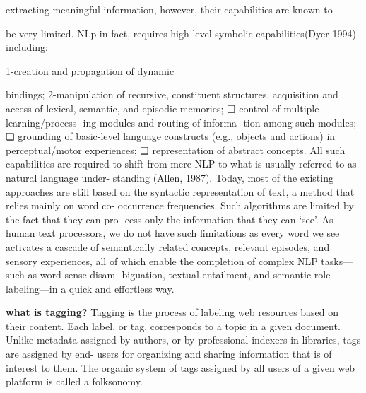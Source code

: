 extracting meaningful information, however, their capabilities are known to 

be very limited. NLp in fact, requires high level symbolic capabilities(Dyer 1994) including:

1-creation and propagation of dynamic 

bindings;
2-manipulation of recursive, constituent structures,
 acquisition and access of lexical, semantic, and episodic memories;
❏ control of multiple learning/process- ing modules and routing of informa- tion among such modules;
❏ grounding of basic-level language constructs (e.g., objects and actions) in perceptual/motor experiences;
❏ representation of abstract concepts.
All such capabilities are required to shift from mere NLP to what is usually referred to as natural language under- standing (Allen, 1987). Today, most of the existing approaches are still based on the syntactic representation of text, a method that relies mainly on word co- occurrence frequencies. Such algorithms are limited by the fact that they can pro- cess only the information that they can ‘see’. As human text processors, we do not have such limitations as every word we see activates a cascade of semantically related concepts, relevant episodes, and sensory experiences, all of which enable the completion of complex NLP tasks—such as word-sense disam- biguation, textual entailment, and semantic role labeling—in a quick and
effortless way.\cite{NLPSurvey}

\textbf{what is tagging?}
Tagging is the process of labeling web resources based on their content. Each label, or tag, corresponds to a topic in a given document. Unlike metadata assigned by authors, or by professional indexers in libraries, tags are assigned by end- users for organizing and sharing information that is of interest to them. The organic system of tags assigned by all users of a given web platform is called a folksonomy. \cite{folksonomy}

